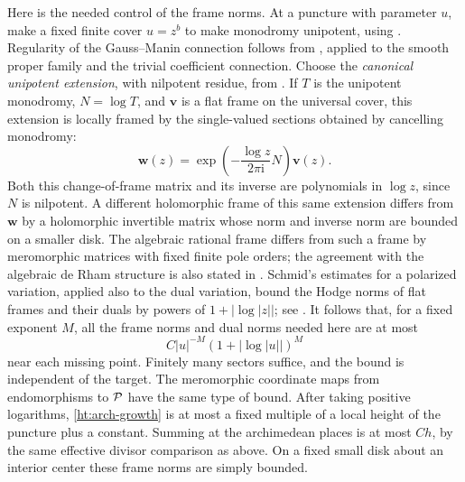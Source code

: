 Here is the needed control of the frame norms. At a puncture with
parameter $u$, make a fixed finite cover $u=z^b$ to make monodromy
unipotent, using \cite[Monodromy Theorem~(6.1)]{Schmid1973}.
Regularity of the Gauss--Manin connection follows from
\cite[II, Proposition~6.14 and Theorem~7.9]{Deligne1970}, applied to
the smooth proper family and the trivial coefficient connection.
Choose the \emph{canonical unipotent extension}, with nilpotent
residue, from \cite[II, \S5, Proposition~5.2]{Deligne1970}.
If $T$ is the unipotent monodromy, $N=\log T$, and $\mathbf v$
is a flat frame on the universal cover, this extension is locally
framed by the single-valued sections obtained by cancelling monodromy:
\[
 \mathbf w(z)=
     \exp\!\left(-\frac{\log z}{2\pi\mathrm i}N\right)
     \mathbf v(z).
\]
Both this change-of-frame matrix and its inverse are polynomials in
$\log z$, since $N$ is nilpotent. A different holomorphic frame of
this same extension differs from $\mathbf w$ by a holomorphic
invertible matrix whose norm and inverse norm are bounded on a smaller
disk. The algebraic rational frame differs from such a frame by
meromorphic matrices with fixed finite pole orders; the agreement
with the algebraic de Rham structure is also stated in
\cite[Theorem~(4.13)(a),(b)]{Schmid1973}.
Schmid's estimates for a
polarized variation, applied also to the dual variation, bound the
Hodge norms of flat frames and their duals by powers of
$1+|\log|z||$; see
\cite[Theorem~(6.6$'$), p.~252]{Schmid1973}.
It follows that, for a fixed exponent $M$, all the frame norms and
dual norms needed here are at most
\begin{equation}\label{ht:arch-growth}
 C|u|^{-M}(1+|\log|u||)^M
\end{equation}
near each missing point. Finitely many sectors suffice, and the bound
is independent of the target. The meromorphic coordinate maps from
endomorphisms to $\mathcal P$ have the same type of bound. After taking
positive logarithms, \eqref{ht:arch-growth} is at most a fixed
multiple of a local height of the puncture plus a constant. Summing
at the archimedean places is at most $Ch$, by the same effective
divisor comparison as above. On a fixed small disk about an interior
center these frame norms are simply bounded.


